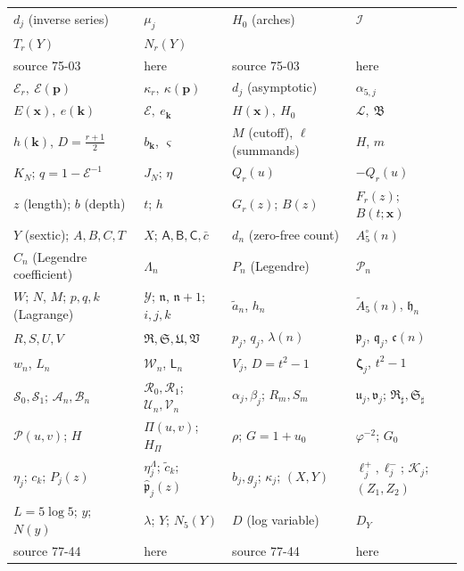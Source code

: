 \documentclass[11pt,a4paper]{article}
\numberwithin{equation}{section}
\theoremstyle{definition}\newtheorem{definition}[theorem]{Definition}
\theoremstyle{remark}\newtheorem{remark}[theorem]{Remark}
\newcommand{\E}{\mathcal E}
\newcommand{\Lcal}{\mathcal L}
\newcommand{\Bmass}{\mathfrak B}
\begin{document}
\begin{table}[!htbp]
\begin{tabular}{@{}ll|ll@{}}
\midrule
$d_j$ (inverse series) & $\mu_j$ & $H_0$ (arches) & $\mathcal I$\\
$T_r(Y)$ & $N_r(Y)$ & & \\
\midrule
source 75-03 & here & source 75-03 & here\\
\midrule
$\mathcal E_r,\ \mathcal E(\boldsymbol p)$ & $\kappa_r,\ \kappa(\boldsymbol p)$ & $d_j$ (asymptotic) & $\alpha_{5,j}$\\
$E(\boldsymbol x),\ e(\boldsymbol k)$ & $\E,\ e_{\boldsymbol k}$ & $H(\boldsymbol x),\ H_0$ & $\Lcal,\ \Bmass$\\
$h(\boldsymbol k)$, $D=\frac{r+1}2$ & $b_{\boldsymbol k}$, $\varsigma$ & $M$ (cutoff), $\ell$ (summands) & $H$, $m$\\
$K_N$; $q=1-\mathcal E^{-1}$ & $J_N$; $\eta$ & $Q_r(u)$ & $-Q_r(u)$\\
$z$ (length); $b$ (depth) & $t$; $h$ & $G_r(z)$; $B(z)$ & $F_r(z)$; $B(t;\boldsymbol x)$\\
$Y$ (sextic); $A,B,C,T$ & $X$; $\mathsf A,\mathsf B,\mathsf C,\bar c$ & $d_n$ (zero-free count) & $A^\circ_5(n)$\\
$C_n$ (Legendre coefficient) & $\Lambda_n$ & $P_n$ (Legendre) & $\mathcal P_n$\\
$W$; $N$, $M$; $p,q,k$ (Lagrange) & $\mathcal Y$; $\mathfrak n$, $\mathfrak n+1$; $i,j,k$ & $\widetilde a_n$, $h_n$ & $\widetilde A_5(n)$, $\mathfrak h_n$\\
$R,S,U,V$ & $\mathfrak R,\mathfrak S,\mathfrak U,\mathfrak V$ & $p_j$, $q_j$, $\lambda(n)$ & $\mathfrak p_j$, $\mathfrak q_j$, $\mathfrak c(n)$\\
$w_n$, $L_n$ & $\mathcal W_n$, $\mathsf L_n$ & $V_j$, $D=t^2-1$ & $\boldsymbol\zeta_j$, $t^2-1$\\
$\mathscr S_0,\mathscr S_1$; $\mathscr A_n,\mathscr B_n$ & $\mathscr R_0,\mathscr R_1$; $\mathscr U_n,\mathscr V_n$ & $\alpha_j,\beta_j$; $R_m,S_m$ & $\mathfrak u_j,\mathfrak v_j$; $\mathfrak R_\sharp,\mathfrak S_\sharp$\\
$\mathscr P(u,v)$; $H$ & $\Pi(u,v)$; $H_\Pi$ & $\rho$; $G=1+u_0$ & $\varphi^{-2}$; $G_0$\\
$\eta_j$; $c_k$; $P_j(z)$ & $\eta^\Lambda_j$; $\tilde c_k$; $\widehat{\mathfrak p}_j(z)$ & $b_j,g_j$; $\kappa_j$; $(X,Y)$ & $\ell^+_j,\ell^-_j$; $\mathcal K_j$; $(Z_1,Z_2)$\\
$L=5\log5$; $y$; $N(y)$ & $\lambda$; $Y$; $N_5(Y)$ & $D$ (log variable) & $D_Y$\\
\midrule
source 77-44 & here & source 77-44 & here\\

\end{tabular}
\end{table}
\end{document}
